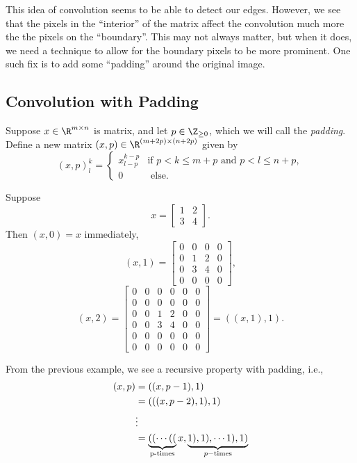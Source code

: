 This idea of convolution seems to be able to detect our edges.  However, we see that the pixels in the ``interior'' of the matrix affect the convolution much more the the pixels on the ``boundary''.  This may not always matter, but when it does, we need a technique to allow for the boundary pixels to be more prominent.  One such fix is to add some ``padding'' around the original image.

\subsection{Convolution with Padding}

Suppose $x\in\R^{m\times n}$ is matrix, and let $p\in\Z_{\geq0}$, which we will call the \textit{padding}.  Define a new matrix $(x,p)\in\R^{(m+2p)\times (n+2p)}$ given by
$$(x,p)^k_l=\begin{cases}
	x^{k-p}_{l-p}&\text{if }p<k\leq m+p\text{ and }p<l\leq n+p,\\
	0&\text{ else.}
\end{cases}$$

\begin{ex}
	Suppose
	$$x=\begin{bmatrix}
		1&2\\
		3&4
	\end{bmatrix}.$$
	Then $(x,0)=x$ immediately,
	$$(x,1)=\begin{bmatrix}
		0&0&0&0\\
		0&1&2&0\\
		0&3&4&0\\
		0&0&0&0
	\end{bmatrix},$$
	$$(x,2)=\begin{bmatrix}
		0&0&0&0&0&0\\
		0&0&0&0&0&0\\
		0&0&1&2&0&0\\
		0&0&3&4&0&0\\
		0&0&0&0&0&0\\
		0&0&0&0&0&0
	\end{bmatrix}=((x,1),1).$$
\end{ex}

From the previous example, we see a recursive property with padding, i.e.,
\begin{align*}
	(x,p)&=((x,p-1),1)\\
	&=(((x,p-2),1),1)\\
	&\vdots\\
	&=\underbrace{((\cdots((}_{\text{p-\text{times}}}x,\underbrace{1),1),\cdots1),1)}_{p-\text{times}}
\end{align*}


